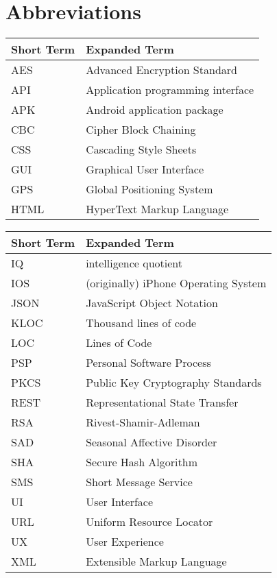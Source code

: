 \chapter{Abbreviations}

\begin{tabular}{p{40mm}|p{100mm}}
	\textbf{Short Term}&\textbf{Expanded Term}\\
	\hline
	
	AES		& Advanced Encryption Standard\\	
	API		& Application programming interface\\
	APK		& Android application package\\
	
	CBC 		& Cipher Block Chaining\\	
	CSS 		& Cascading Style Sheets\\
	
	GUI		& Graphical User Interface\\
	GPS		& Global Positioning System\\
	
	HTML 	& HyperText Markup Language\\


\end{tabular}

\begin{tabular}{p{40mm}|p{100mm}}
	\textbf{Short Term}&\textbf{Expanded Term}\\
	\hline

	IQ			& intelligence quotient\\
	IOS 		& (originally) iPhone Operating System\\
	
	JSON 	& JavaScript Object Notation\\

	KLOC	&	Thousand lines of code\\
	
	LOC		&	Lines of Code\\

	PSP		& 	Personal Software Process\\	
	PKCS 	& Public Key Cryptography Standards\\
	
	REST		& Representational State Transfer\\
	RSA		& Rivest-Shamir-Adleman\\
	
	SAD 		& Seasonal Affective Disorder\\
	SHA 		& Secure Hash Algorithm\\
	SMS 		& Short Message Service\\
	
	UI			& User Interface\\
	URL		& Uniform Resource Locator\\
	UX 		& User Experience\\	
	
	XML		& Extensible Markup Language\\

\end{tabular}